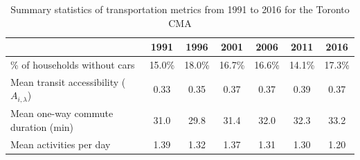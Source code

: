 \begin{table}[H]
	\small
	\centering
	\caption{{Summary statistics of transportation metrics from 1991 to 2016 for the Toronto CMA}}
	\label{table:tts}
	\begin{tabular}{lcccccc}
		\hline
		\textbf{}                          & \textbf{1991} & \textbf{1996} & \textbf{2001} & \textbf{2006} & \textbf{2011} & \textbf{2016} \\
		\hline
		
		
		\% of households without cars                            & 15.0\%  & 18.0\%  & 16.7\% & 16.6\%  & 14.1\%  & 17.3\%  \\
		Mean transit accessibility ($A_{i,\lambda}$) & 0.33 & 0.35 & 0.37 & 0.37 & 0.39 & 0.37 \\
		
		Mean one-way commute duration (min)                              & 31.0    & 29.8    & 31.4   & 32.0    & 32.3    & 33.2    \\
		Mean activities per day                                  & 1.39     & 1.32     & 1.37    & 1.31     & 1.30     & 1.20    \\ 
		\hline
	\end{tabular}
\end{table}

